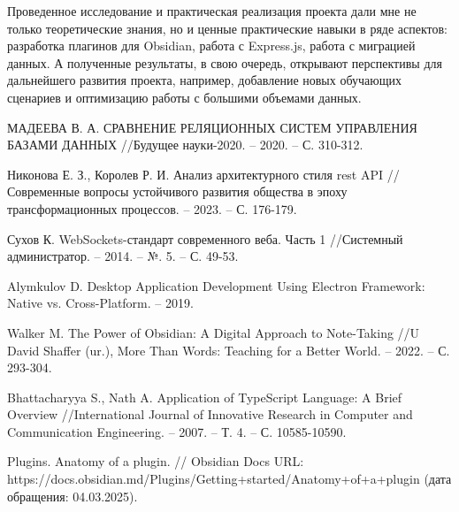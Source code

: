 \documentclass[14pt]{extarticle}
\begin{document}
	Проведенное исследование и практическая реализация проекта дали мне не только теоретические знания, но и ценные практические навыки в ряде аспектов: разработка плагинов для Obsidian, работа с Express.js,  работа с миграцией данных. А полученные результаты, в свою очередь, открывают перспективы для дальнейшего развития проекта, например, добавление новых обучающих сценариев и оптимизацию работы с большими объемами данных. 
	\newpage
	\begin{thebibliography}{2}
		
		
		МАДЕЕВА В. А. СРАВНЕНИЕ РЕЛЯЦИОННЫХ СИСТЕМ УПРАВЛЕНИЯ БАЗАМИ ДАННЫХ //Будущее науки-2020. – 2020. – С. 310-312.
		
		Никонова Е. З., Королев Р. И. Анализ архитектурного стиля rest API //Современные вопросы устойчивого развития общества в эпоху трансформационных процессов. – 2023. – С. 176-179.
		
		Сухов К. WebSockets-стандарт современного веба. Часть 1 //Системный администратор. – 2014. – №. 5. – С. 49-53.
		
		Alymkulov D. Desktop Application Development Using Electron Framework: Native vs. Cross-Platform. – 2019.
		
		 Walker M. The Power of Obsidian: A Digital Approach to Note-Taking //U David Shaffer (ur.), More Than Words: Teaching for a Better World. – 2022. – С. 293-304.
		
		Bhattacharyya S., Nath A. Application of TypeScript Language: A Brief Overview //International Journal of Innovative Research in Computer and Communication Engineering. – 2007. – Т. 4. – С. 10585-10590.
		
		Plugins. Anatomy of a plugin. // Obsidian Docs URL: https://docs.obsidian.md/Plugins/Getting+started/Anatomy+of+a+plugin (дата обращения: 04.03.2025).
		

\end{thebibliography}
\end{document}
